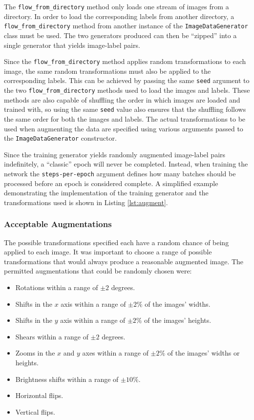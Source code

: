 The \texttt{flow\_from\_directory} method only loads one stream of images from a directory. In order to load the corresponding labels from another directory, a \texttt{flow\_from\_directory} method from another instance of the \texttt{ImageDataGenerator} class must be used. The two generators produced can then be ``zipped'' into a single generator that yields image-label pairs.

Since the \texttt{flow\_from\_directory} method applies random transformations to each image, the same random transformations must also be applied to the corresponding labels. This can be achieved by passing the same \texttt{seed} argument to the two \texttt{flow\_from\_directory} methods used to load the images and labels. These methods are also capable of shuffling the order in which images are loaded and trained with, so using the same \texttt{seed} value also ensures that the shuffling follows the same order for both the images and labels. The actual transformations to be used when augmenting the data are specified using various arguments passed to the \texttt{ImageDataGenerator} constructor.

Since the training generator yields randomly augmented image-label pairs indefinitely, a ``classic'' epoch will never be completed. Instead, when training the network the \texttt{steps-per-epoch} argument defines how many batches should be processed before an epoch is considered complete. A simplified example demonstrating the implementation of the training generator and the transformations used is shown in Listing \ref{lst:augment}.

\subsubsection{Acceptable Augmentations}

The possible transformations specified each have a random chance of being applied to each image. It was important to choose a range of possible transformations that would always produce a reasonable augmented image. The permitted augmentations that could be randomly chosen were:

\begin{itemize}
    \item Rotations within a range of $\pm 2$ degrees.
    \item Shifts in the $x$ axis within a range of $\pm 2\%$ of the images' widths.
    \item Shifts in the $y$ axis within a range of $\pm 2\%$ of the images' heights.
    \item Shears within a range of $\pm 2$ degrees.
    \item Zooms in the $x$ and $y$ axes within a range of $\pm 2\%$ of the images' widths or heights.
    \item Brightness shifts within a range of $\pm 10\%$.
    \item Horizontal flips.
    \item Vertical flips.
\end{itemize}

